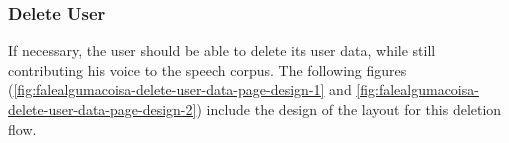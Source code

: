 \subsubsection{Delete User}

If necessary, the user should be able to delete its user data, while still contributing his voice to the speech corpus. The following figures (\ref{fig:falealgumacoisa-delete-user-data-page-design-1} and \ref{fig:falealgumacoisa-delete-user-data-page-design-2}) include the design of the layout for this deletion flow.

\begin{figure}[ht]
    \centering
    \caption{Fale Alguma Coisa Delete User Data steps designs}
    \begin{subfigure}{.5\textwidth}
      \centering

\end{subfigure}
\end{figure}
